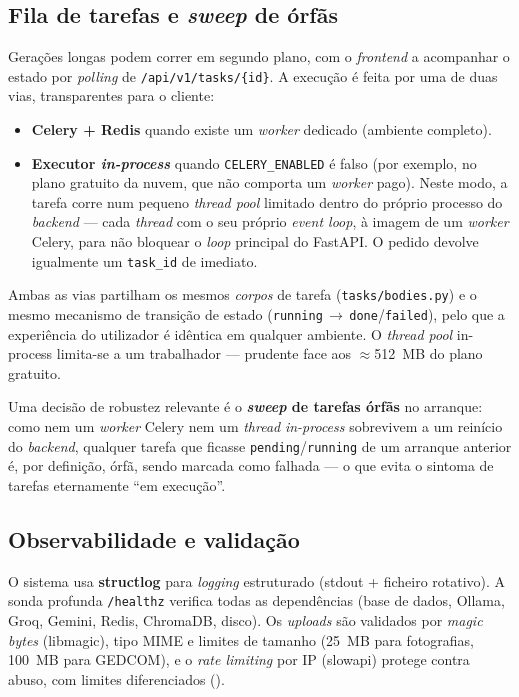 \subsection{Fila de tarefas e \emph{sweep} de órfãs}

Gerações longas podem correr em segundo plano, com o \emph{frontend} a
acompanhar o estado por \emph{polling} de \texttt{/api/v1/tasks/\{id\}}.
A execução é feita por uma de duas vias, transparentes para o cliente:

\begin{itemize}[leftmargin=*]
  \item \textbf{Celery + Redis} quando existe um \emph{worker} dedicado
  (ambiente completo).
  \item \textbf{Executor \emph{in-process}} quando \texttt{CELERY\_ENABLED}
  é falso (por exemplo, no plano gratuito da nuvem, que não comporta um
  \emph{worker} pago). Neste modo, a tarefa corre num pequeno
  \emph{thread pool} limitado dentro do próprio processo do \emph{backend}
  --- cada \emph{thread} com o seu próprio \emph{event loop}, à imagem de um
  \emph{worker} Celery, para não bloquear o \emph{loop} principal do
  FastAPI. O pedido devolve igualmente um \texttt{task\_id} de imediato.
\end{itemize}

Ambas as vias partilham os mesmos \emph{corpos} de tarefa
(\texttt{tasks/bodies.py}) e o mesmo mecanismo de transição de estado
(\texttt{running}\,$\rightarrow$\,\texttt{done}/\texttt{failed}), pelo que a
experiência do utilizador é idêntica em qualquer ambiente. O \emph{thread
pool} in-process limita-se a um trabalhador --- prudente face aos
$\approx$512~MB do plano gratuito.

Uma decisão de robustez relevante é o \textbf{\emph{sweep} de tarefas
órfãs} no arranque: como nem um \emph{worker} Celery nem um \emph{thread}
\emph{in-process} sobrevivem a um reinício do \emph{backend}, qualquer
tarefa que ficasse \texttt{pending}/\texttt{running} de um arranque
anterior é, por definição, órfã, sendo marcada como falhada --- o que evita
o sintoma de tarefas eternamente ``em execução''.

\subsection{Observabilidade e validação}

O sistema usa \textbf{structlog} para \emph{logging} estruturado (stdout +
ficheiro rotativo). A sonda profunda \texttt{/healthz} verifica todas as
dependências (base de dados, Ollama, Groq, Gemini, Redis, ChromaDB, disco). Os
\emph{uploads} são validados por \emph{magic bytes} (libmagic), tipo MIME
e limites de tamanho (25~MB para fotografias, 100~MB para GEDCOM), e o
\emph{rate limiting} por IP (slowapi) protege contra abuso, com limites
diferenciados ().

